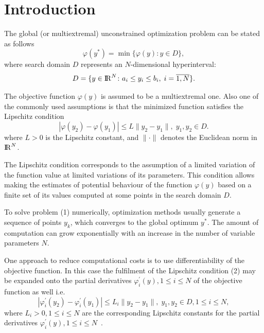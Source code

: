 \documentclass[runningheads]{llncs}
\begin{document}
\section{Introduction}

The global (or multiextremal) unconstrained optimization problem \cite{Floudas1996,Floudas2016,Horst1990,Locatelli2013,Pardalos2016,Paulavicius2014,Pinter1996,Strongin1978,Strongin2000,Strongin2013,Zhigljavsky2008} can be stated as follows
\begin{equation}
\label{eq:problem_statement}
\varphi(y^*) = \min\{\varphi(y)\colon y \in D\},
\end{equation}
where search domain $D$ represents an $N$-dimensional hyperinterval:
\[
D = \{y \in \bbbr^N\colon a_i \leq y_i \leq b_i,\; i = \overline{1,N}\}.
\]

The objective function $\varphi(y)$ is assumed to be a multiextremal one. Also one of the commonly used assumptions is that the minimized function satisfies the Lipschitz condition
\begin{equation}
\label{eq:Lipschitz_for_function}
|\varphi(y_2) - \varphi(y_1)| \leq L \|y_2 - y_1\|,\; y_1, y_2 \in D.
\end{equation} 
where $L > 0$ is the Lipschitz constant, and $\| \cdot \|$ denotes the Euclidean norm in ${\rm I\!R}^N$.

The Lipschitz condition corresponds to the assumption of a limited variation of the function value at limited variations of its parameters. This condition allows making the estimates of potential behaviour of the function $\varphi(y)$ based on a finite set of its values computed at some points in the search domain $D$.

To solve problem (1) numerically, optimization methods usually generate a sequence of points $y_k$, which converges to the global optimum $y^*$. The amount of computation can grow exponentially with an increase in the number of variable parameters $N$.

One approach to reduce computational costs is to use differentiability of the objective function. In this case the fulfilment of the Lipschitz condition (2) may be expanded onto the partial derivatives $\varphi_i^\prime(y), 1 \leq i \leq N$ of the objective function as well i.e.
\begin{equation}
\label{eq:Lipschitz_for_derivative}
|\varphi_i^\prime(y_2) - \varphi_i^\prime(y_1)| \leq L_i \|y_2 - y_1\|,\; y_1, y_2 \in D, 1 \leq i \leq N,
\end{equation} 
where $L_i > 0, 1 \leq i \leq N$ are the corresponding Lipschitz constants for the partial derivatives $\varphi_i^\prime(y), 1 \leq i \leq N$~\cite{Baritompa1994,Breiman1993,Gergel1996,Gergel1997,Gergel2017,Lera2013,Sergeyev1998,Sergeyev2015,Shpak1995}.
\end{document}
